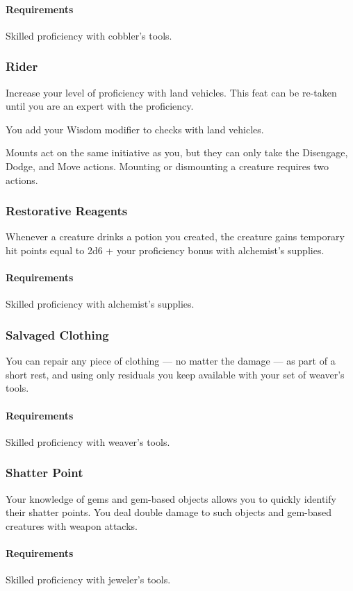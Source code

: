    \paragraph{Requirements} Skilled proficiency with cobbler's tools.
\subsubsection{Rider} \label{feat::rider}
    Increase your level of proficiency with land vehicles.
    This feat can be re-taken until you are an expert with the proficiency.

    You add your Wisdom modifier to checks with land vehicles.

    Mounts act on the same initiative as you, but they can only take the Disengage, Dodge, and Move actions.
    Mounting or dismounting a creature requires two actions.
\subsubsection{Restorative Reagents} \label{feat::restorativereagents}
    Whenever a creature drinks a potion you created, the creature gains temporary hit points equal to 2d6 + your proficiency bonus with alchemist's supplies.
    \paragraph{Requirements} Skilled proficiency with alchemist's supplies.
\subsubsection{Salvaged Clothing} \label{feat::salvagedclothing}
    You can repair any piece of clothing --- no matter the damage --- as part of a short rest, and using only residuals you keep available with your set of weaver's tools.
    \paragraph{Requirements} Skilled proficiency with weaver's tools.
\subsubsection{Shatter Point} \label{feat::shatterpoint}
    Your knowledge of gems and gem-based objects allows you to quickly identify their shatter points.
    You deal double damage to such objects and gem-based creatures with weapon attacks.
    \paragraph{Requirements} Skilled proficiency with jeweler's tools.
